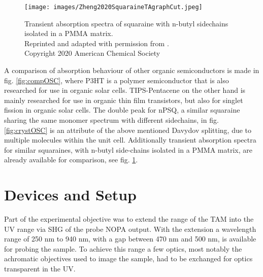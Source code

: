 \documentclass[twoside,openright,listof=numbered]{scrreprt}
\begin{document}
\begin{figure}[hbtp]
\centering
\texttt{[image: images/Zheng2020SquaraineTAgraphCut.jpeg]}
\caption[Transient absorption spectra of squaraine with n-butyl sidechains by Zheng.\cite{Zheng2020}]{Transient absorption spectra of squaraine with n-butyl sidechains isolated in a PMMA matrix.\\
Reprinted and adapted with permission from \protect{}. \\Copyright 2020 American Chemical Society\label{fig:zhengTA}}
\end{figure}

A comparison of absorption behaviour of other organic semiconductors is made in fig. \ref{fig:compOSC}, where P3HT is a polymer semiconductor that is also researched for use in organic solar cells.\cite{Holliday2016} TIPS-Pentacene on the other hand is mainly researched for use in organic thin film transistors, but also for singlet fission in organic solar cells.\cite{Schaberle2020} The double peak for nPSQ, a similar squaraine sharing the same monomer spectrum with different sidechains, in fig. \ref{fig:crystOSC} is an attribute of the above mentioned Davydov splitting, due to multiple molecules within the unit cell.\cite{Balzer2022} Additionally transient absorption spectra for similar squaraines, with n-butyl side-chains isolated in a PMMA matrix, are already available for comparison, see fig. \ref{fig:zhengTA}.\cite{Zheng2020}



\chapter{Devices and Setup}

Part of the experimental objective was to extend the range of the TAM into the UV range via SHG of the probe NOPA output. With the extension a wavelength range of 250 nm to 940 nm, with a gap between 470 nm and 500 nm, is available for probing the sample. To achieve this range a few optics, most notably the achromatic objectives used to image the sample, had to be exchanged for optics transparent in the UV.
\end{document}
